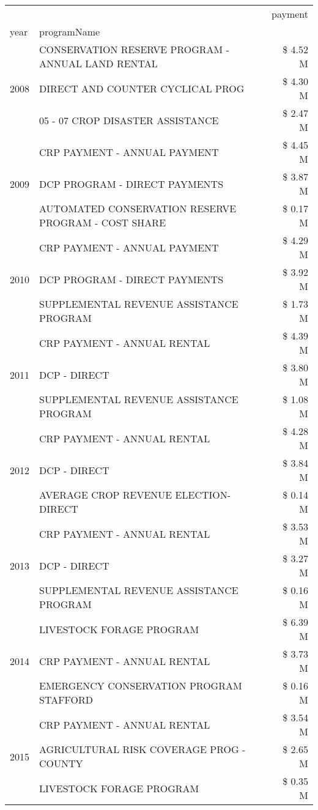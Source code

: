 \begin{tabular}{llr}
\toprule
 &  & payment \\
year & programName &  \\
\midrule
\multirow[t]{3}{*}{2008} & CONSERVATION RESERVE PROGRAM - ANNUAL LAND RENTAL & \$ 4.52 M \\
 & DIRECT AND COUNTER CYCLICAL PROG & \$ 4.30 M \\
 & 05 - 07 CROP DISASTER ASSISTANCE & \$ 2.47 M \\
\cline{1-3}
\multirow[t]{3}{*}{2009} & CRP PAYMENT - ANNUAL PAYMENT & \$ 4.45 M \\
 & DCP PROGRAM - DIRECT PAYMENTS & \$ 3.87 M \\
 & AUTOMATED CONSERVATION RESERVE PROGRAM - COST SHARE & \$ 0.17 M \\
\cline{1-3}
\multirow[t]{3}{*}{2010} & CRP PAYMENT - ANNUAL PAYMENT & \$ 4.29 M \\
 & DCP PROGRAM - DIRECT PAYMENTS & \$ 3.92 M \\
 & SUPPLEMENTAL REVENUE ASSISTANCE PROGRAM & \$ 1.73 M \\
\cline{1-3}
\multirow[t]{3}{*}{2011} & CRP PAYMENT - ANNUAL RENTAL & \$ 4.39 M \\
 & DCP - DIRECT & \$ 3.80 M \\
 & SUPPLEMENTAL REVENUE ASSISTANCE PROGRAM & \$ 1.08 M \\
\cline{1-3}
\multirow[t]{3}{*}{2012} & CRP PAYMENT - ANNUAL RENTAL & \$ 4.28 M \\
 & DCP - DIRECT & \$ 3.84 M \\
 & AVERAGE CROP REVENUE ELECTION-DIRECT & \$ 0.14 M \\
\cline{1-3}
\multirow[t]{3}{*}{2013} & CRP PAYMENT - ANNUAL RENTAL & \$ 3.53 M \\
 & DCP - DIRECT & \$ 3.27 M \\
 & SUPPLEMENTAL REVENUE ASSISTANCE PROGRAM & \$ 0.16 M \\
\cline{1-3}
\multirow[t]{3}{*}{2014} & LIVESTOCK FORAGE PROGRAM & \$ 6.39 M \\
 & CRP PAYMENT - ANNUAL RENTAL & \$ 3.73 M \\
 & EMERGENCY CONSERVATION PROGRAM STAFFORD & \$ 0.16 M \\
\cline{1-3}
\multirow[t]{3}{*}{2015} & CRP PAYMENT - ANNUAL RENTAL & \$ 3.54 M \\
 & AGRICULTURAL RISK COVERAGE PROG - COUNTY & \$ 2.65 M \\
 & LIVESTOCK FORAGE PROGRAM & \$ 0.35 M \\

\end{tabular}
